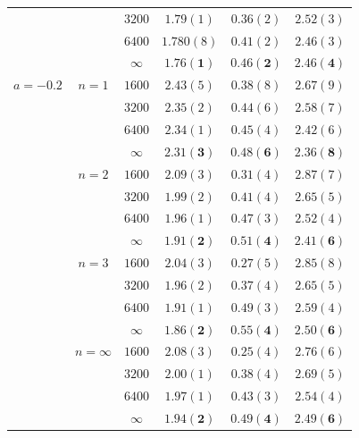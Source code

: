 \begin{table}[t]
\begin{center}
\begin{tabular*}{\linewidth}{@{\extracolsep{\fill}}cccccc}
       & & $3200$ & $1.79(1)$ & $0.36(2)$ & $2.52(3)$ \\
       & & $6400$ & $1.780(8)$ & $0.41(2)$ & $2.46(3)$ \\
       & & $\mathbf{\infty}$ & $\mathbf{1.76(1)}$ & $\mathbf{0.46(2)}$ & $\mathbf{2.46(4)}$ \\\hline
       $a=-0.2$ & $n=1$ & $1600$ & $2.43(5)$ & $0.38(8)$ & $2.67(9)$ \\
       & & $3200$ & $2.35(2)$ & $0.44(6)$ & $2.58(7)$ \\
       & & $6400$ & $2.34(1)$ & $0.45(4)$ & $2.42(6)$ \\
       & & $\mathbf{\infty}$ & $\mathbf{2.31(3)}$ & $\mathbf{0.48(6)}$ & $\mathbf{2.36(8)}$ \\\cline{2-6}
       & $n=2$ & $1600$ & $2.09(3)$ & $0.31(4)$ & $2.87(7)$\\
       & & $3200$ & $1.99(2)$ & $0.41(4)$ & $2.65(5)$\\
       & & $6400$ & $1.96(1)$ & $0.47(3)$ & $2.52(4)$\\
       & & $\mathbf{\infty}$ & $\mathbf{1.91(2)}$ & $\mathbf{0.51(4)}$ & $\mathbf{2.41(6)}$ \\\cline{2-6}
       & $n=3$ & $1600$ & $2.04(3)$ & $0.27(5)$ & $2.85(8)$\\
       & & $3200$ & $1.96(2)$ & $0.37(4)$ & $2.65(5)$\\
       & & $6400$ & $1.91(1)$ & $0.49(3)$ & $2.59(4)$\\
       & & $\mathbf{\infty}$ & $\mathbf{1.86(2)}$ & $\mathbf{0.55(4)}$ & $\mathbf{2.50(6)}$ \\\cline{2-6}
       & $n=\infty$ & $1600$ & $2.08(3)$ & $0.25(4)$ & $2.76(6)$ \\
       & & $3200$ & $2.00(1)$ & $0.38(4)$ & $2.69(5)$ \\
       & & $6400$ & $1.97(1)$ & $0.43(3)$ & $2.54(4)$ \\
       & & $\mathbf{\infty}$ & $\mathbf{1.94(2)}$ & $\mathbf{0.49(4)}$ & $\mathbf{2.49(6)}$ \\\hline
    \end{tabular*}
  \end{center}
\end{table}


